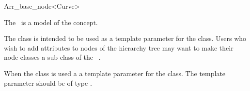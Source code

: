 
\ccRefPageBegin

\begin{ccRefClass}{Arr_base_node<Curve>}

\ccDefinition
    The \ccRefName\ is a model of the  concept.

    The class is intended to be used as a template parameter for the
     class. Users who
    wish to add attributes to nodes of the hierarchy tree may want
    to make their node classes a sub-class of the \ccRefName\ .


    When the class is used a a template parameter for the
     class. The
    template parameter  should be of type
    .

\ccIsModel

\end{ccRefClass}
\ccRefPageEnd

